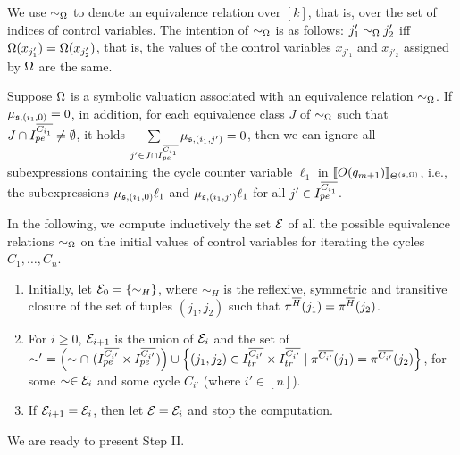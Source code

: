 We use $\sim_\Omega$ to denote an equivalence relation over $[k]$, that is, over the set of indices of control variables. The intention of $\sim_\Omega$ is as follows: $j'_1 \sim_\Omega j'_2$ iff $\Omega(x_{j'_1})=\Omega(x_{j'_2})$, that is, the values of the control variables $x_{j'_1}$ and $x_{j'_2}$ assigned by $\Omega$ are the same. 

Suppose $\Omega$ is a symbolic valuation associated with an equivalence relation $\sim_\Omega$.  If $\mu_{{\mathfrak{s} },(i_1,0)}=0$, in addition, for each equivalence class $J$ of $\sim_\Omega$ such that $J \cap I^{\overline{C_{i_1}}}_{pe} \neq \emptyset$, it holds $\sum \limits_{j' \in J \cap I^{\overline{C_{i_1}}}_{pe} } \mu_{{\mathfrak{s} },(i_1,j')}=0$, then we can ignore all subexpressions containing the cycle counter variable $\ell_1$ in   $\llbracket O(q_{m+1})\rrbracket_{\Theta^{({\mathfrak{s} },\Omega)}}$, i.e., the subexpressions $\mu_{{\mathfrak{s} },(i_1,0)}\ell_1$ and $\mu_{{\mathfrak{s} },(i_1,j')}\ell_1$ for all $j' \in I^{\overline{C_{i_1}}}_{pe}$.
%

In the following, we compute inductively the set ${\mathcal{E} }$ of all the possible equivalence relations $\sim_\Omega$ on the initial values of control variables for iterating the cycles $C_1,\dots, C_n$.
\begin{enumerate}
\item Initially, let ${\mathcal{E} }_0 = \{\sim_H\}$, where $\sim_H$ is the reflexive, symmetric and transitive closure of the set of tuples $(j_1,j_2)$ such that $\pi^{\overline{H}}(j_1) = \pi^{\overline{H}}({j_2})$.
%
\item For $i \ge 0$, ${\mathcal{E} }_{i+1}$ is the union of ${\mathcal{E} }_i$ and the set of $\sim'\ = \left(\sim \cap\ (I^{\circled{C_{i'}}}_{pe} \times I^{\circled{C_{i'}}}_{pe})\right) \cup \left\{(j_1,j_2) \in I^{\circled{C_{i'}}}_{tr} \times I^{\circled{C_{i'}}}_{tr} \mid \pi^{\circled{C_{i'}}}(j_1) = \pi^{\circled{C_{i'}}}(j_2) \right\}$, for some $\sim \in {\mathcal{E} }_i$ and some cycle $C_{i'}$ (where $i' \in [n]$).
%
\item If ${\mathcal{E} }_{i+1} = {\mathcal{E} }_i$, then let ${\mathcal{E} } = {\mathcal{E} }_i$ and stop the computation.
\end{enumerate}
%
%
We are ready to present Step II.
\bigskip\\
\bigskip

